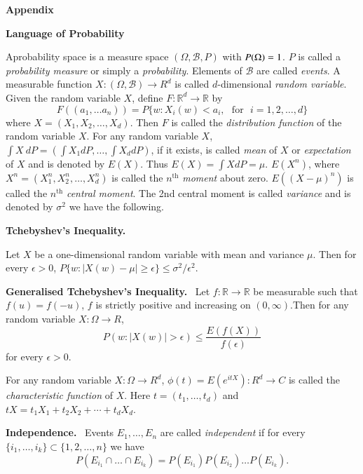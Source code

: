 \begin{center}
{\huge\bf Appendix}
\bigskip

{\Large\bf Language of Probability}
\end{center}
\bigskip


\begin{defi*}
A\pageoriginale probability space is a measure space
$(\Omega,\mathscr{B},P)$ with $P(\Omega)\break =1$. $P$ is called a {\em
  probability measure} or simply a {\em probability}. Elements of
$\mathscr{B}$ are called {\em events}. A measurable function
$X:(\Omega,\mathscr{B})\to R^{d}$ is called $d$-dimensional {\em
  random variable}. Given the random variable $X$, define $F:\mathbb{R}^{d}\to
\mathbb{R}$ by
$$
F((a_{1},\ldots a_{n}))=P\{w:X_{i}(w)<a_{i},\text{~ for~ } i=1,2,\ldots,d\}
$$
where $X=(X_{1},X_{2},\ldots,X_{d})$. Then $F$ is called the {\em
  distribution function} of the random variable $X$. For any random
variable $X$, $\int X\ dP=(\int X_{1}dP,\ldots,\int X_{d}dP)$, if it
exists, is called {\em mean} of $X$ or {\em expectation} of $X$ and is
denoted by $E(X)$. Thus $E(X)=\int XdP=\mu$. $E(X^{n})$, where
$X^{n}=(X^{n}_{1},X^{n}_{2},\ldots,X^{n}_{d})$ is called the
$n^{\text{th}}$ {\em moment} about zero. $E((X-\mu)^{n})$ is called
the $n^{\text{th}}$ {\em central moment}. The 2nd central moment is
called {\em variance} and is denoted by $\sigma^{2}$ we have the
following.
\end{defi*}

\medskip
\noindent
{\bf Tchebyshev's Inequality.}
\smallskip

Let $X$ be a one-dimensional random variable with mean and variance
$\mu$. Then for every $\epsilon>0$, $P\{w:|X(w)-\mu|\geq\epsilon\}\leq
\sigma^{2}/\epsilon^{2}$. 

\medskip
\noindent
{\bf Generalised Tchebyshev's Inequality.}~ Let $f:\mathbb{R}\to
\mathbb{R}$ be measurable such that $f(u)=f(-u)$, $f$ is strictly
positive and increasing on $(0,\infty)$.\pageoriginale Then for any
random variable $X:\Omega\to R$,
$$
P(w:|X(w)|>\epsilon)\leq \frac{E(f(X))}{f(\epsilon)}
$$
for every $\epsilon>0$.

For any random variable $X:\Omega\to R^{d}$,
$\phi(t)=E(e^{itX}):R^{d}\to C$ is called the {\em characteristic
  function} of $X$. Here $t=(t_{1},\ldots,t_{d})$ and
$tX=t_{1}X_{1}+t_{2}X_{2}+\cdots+t_{d}X_{d}$. 

\medskip
\noindent
{\bf Independence.}~ Events $E_{1},\ldots,E_{n}$ are called {\em
  independent} if for every $\{i_{1},\ldots,i_{k}\}\subset
\{1,2,\ldots,n\}$ we have
$$
P(E_{i_{1}}\cap \ldots \cap E_{i_{k}})=P(E_{i_{1}})P(E_{i_{2}})\ldots
P(E_{i_{k}}).
$$


